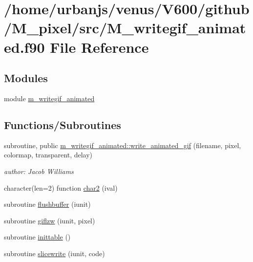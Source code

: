 \hypertarget{M__writegif__animated_8f90}{}\section{/home/urbanjs/venus/\+V600/github/\+M\+\_\+pixel/src/\+M\+\_\+writegif\+\_\+animated.f90 File Reference}
\label{M__writegif__animated_8f90}
\subsection*{Modules}
\begin{DoxyCompactItemize}
\item 
module \mbox{\hyperlink{namespacem__writegif__animated}{m\+\_\+writegif\+\_\+animated}}
\end{DoxyCompactItemize}
\subsection*{Functions/\+Subroutines}
\begin{DoxyCompactItemize}
\item 
subroutine, public \mbox{\hyperlink{namespacem__writegif__animated_a3da6a5c71a9d9e1f49aa075adc6629bd}{m\+\_\+writegif\+\_\+animated\+::write\+\_\+animated\+\_\+gif}} (filename, pixel, colormap, transparent, delay)
\begin{DoxyCompactList}\small\item\em author\+: Jacob Williams \end{DoxyCompactList}\item 
character(len=2) function \mbox{\hyperlink{M__writegif__animated_8f90_a795066c06f318c8d4ba41430b6826567}{char2}} (ival)
\item 
subroutine \mbox{\hyperlink{M__writegif__animated_8f90_a83cb0569b0e010d8ad27afd1b4cd945e}{flushbuffer}} (iunit)
\item 
subroutine \mbox{\hyperlink{M__writegif__animated_8f90_aa30b256c6cb90f13a18e32768d35696b}{giflzw}} (iunit, pixel)
\item 
subroutine \mbox{\hyperlink{M__writegif__animated_8f90_acd7274fbac8690a12be91b542378a4eb}{inittable}} ()
\item 
subroutine \mbox{\hyperlink{M__writegif__animated_8f90_ac5c0245eea61f109cbf3ce5bbf38981b}{slicewrite}} (iunit, code)
\end{DoxyCompactItemize}


